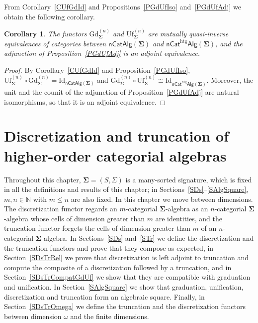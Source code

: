 \documentclass[a4paper, reqno]{amsbook}
\newcommand{\sig}[1]{\mathbf{#1}}             %
\newcommand{\htg}{\mathrm{htg}}                %
\newcommand{\Id}{\mathrm{Id}}
\newcommand{\Gd}{\mathrm{Gd}}
\newcommand{\Uf}{\mathrm{Uf}}
\theoremstyle{plain}
\newtheorem{corollary}[theorem]{Corollary}
\theoremstyle{definition}
\begin{document}
From Corollary~\ref{CUfGdId} and Propositions~\ref{PGdUfIso} and~\ref{PGdUfAdj} we obtain the following corollary.

\begin{corollary}\label{CGdUfEquiv}
The functors $\Gd^{(n)}_{\sig{\Sigma}}$ and $\Uf^{(n)}_{\sig{\Sigma}}$ are mutually quasi-inverse equivalences of categories between $\mathsf{nCatAlg}(\sig{\Sigma})$ and $\mathsf{nCat}^{\htg}\mathsf{Alg}(\sig{\Sigma})$, and the adjunction of Proposition~\ref{PGdUfAdj} is an adjoint equivalence.
\end{corollary}
\begin{proof}
By Corollary~\ref{CUfGdId} and Proposition~\ref{PGdUfIso}, $\Uf^{(n)}_{\sig{\Sigma}}\circ\Gd^{(n)}_{\sig{\Sigma}}=\Id_{\mathsf{nCatAlg}(\sig{\Sigma})}$ and $\Gd^{(n)}_{\sig{\Sigma}}\circ\Uf^{(n)}_{\sig{\Sigma}}\cong\Id_{\mathsf{nCat}^{\htg}\mathsf{Alg}(\sig{\Sigma})}$.
Moreover, the unit and the counit of the adjunction of Proposition~\ref{PGdUfAdj} are natural isomorphisms, so that it is an adjoint equivalence.
\end{proof}

\chapter[Discretization and truncation]{Discretization and truncation of higher-order categorial algebras}\label{SDsTr}

Throughout this chapter, $\sig{\Sigma}=(S,\Sigma)$ is a many-sorted signature, which is fixed in all the definitions and results of this chapter; in Sections~\ref{SDs}--\ref{SAlgSquare}, $m,n\in\mathbb{N}$ with $m\leq n$ are also fixed.
In this chapter we move between dimensions.
The discretization functor regards an $m$-categorial $\sig{\Sigma}$-algebra as an $n$-categorial $\sig{\Sigma}$-algebra whose cells of dimension greater than $m$ are identities, and the truncation functor forgets the cells of dimension greater than $m$ of an $n$-categorial $\sig{\Sigma}$-algebra.
In Sections~\ref{SDs} and~\ref{STr} we define the discretization and the truncation functors and prove that they compose as expected, in Section~\ref{SDsTrRel} we prove that discretization is left adjoint to truncation and compute the composite of a discretization followed by a truncation, and in Section~\ref{SDsTrCompatGdUf} we show that they are compatible with graduation and unification.
In Section~\ref{SAlgSquare} we show that graduation, unification, discretization and truncation form an algebraic square.
Finally, in Section~\ref{SDsTrOmega} we define the truncation and the discretization functors between dimension $\omega$ and the finite dimensions.
\end{document}
